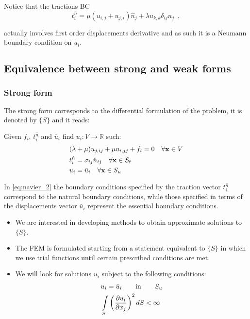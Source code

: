 Notice that the tractions BC 
\[t_i^{\hat n} = \mu (u_{i,j} + u_{j,i}) \hat{n}_j + \lambda u_{k,k} \delta_{ij}\hat{n}_j \enspace ,\]

actually involves first order displacements derivative and as such it is a Neumann boundary condition on $u_i$.
%

\subsection{Equivalence between strong and weak forms}
\subsubsection{Strong form}
The strong form corresponds to the differential formulation of the problem, it is denoted by $\{ S \}$ and it reads:

Given $f_i$, $t_i^{\hat n}$ and ${\bar u_i}$ find ${u_i}:V \to \mathbb{R}$ such:
%
\begin{equation} \label{eq:navier_2}
\begin{split}
&(\lambda  + \mu)u_{j,ij} + \mu u_{i,jj} + f_i = 0 \quad \forall \vb{x} \in V \\
&t_i^{\hat n} = \sigma _{ij} \hat{n}_{ij} \quad \forall \vb{x} \in S_t\\
&u_i = \bar{u}_i \quad \forall \vb{x} \in S_u
\end{split}
\end{equation}

In \cref{eq:navier_2} the boundary conditions specified by the traction vector $t_i^{\hat n}$ correspond to the natural boundary conditions, while those specified in terms of the displacements vector $\bar u_i$ represent the essential boundary conditions.

\begin{itemize}
\item We are interested in developing methods to obtain approximate solutions to $\{S\}$.
\item The FEM is formulated starting from a statement equivalent to $\{ S \}$ in which we use trial functions until certain prescribed conditions are met.
\item We will look for solutions $u_i$ subject to the following conditions:
\begin{align*}
&u_i = \bar u_i \qquad \text{in} \qquad S_u\\
&\int\limits_S \left(\pdv{u_i}{x_j} \right)^2 dS < \infty
\end{align*}

\end{itemize}

